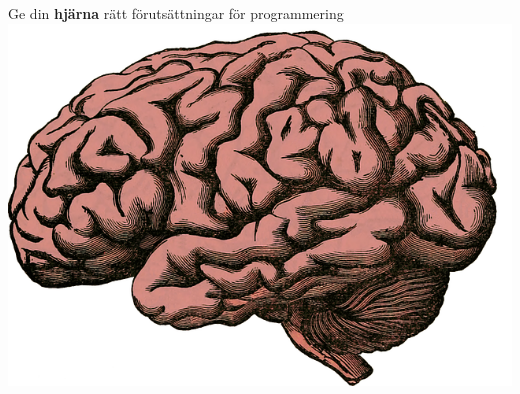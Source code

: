 
\ifkompendium\else
\begin{SlideExtra}{Ge din \textbf{hjärna} rätt förutsättningar för programmering}
  \includegraphics[height=0.9\textheight]{../img/brain.png}
\end{SlideExtra}
\fi
  